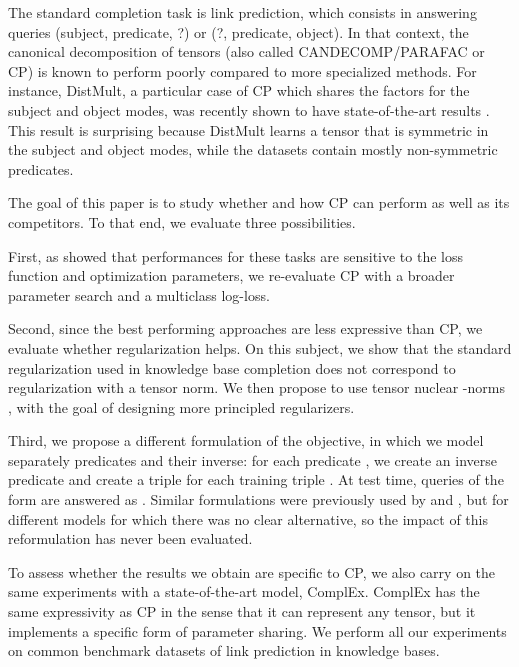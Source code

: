 \documentclass{article}
\newcommand{\CP}{{CP}\xspace}
\newcommand{\complex}{{ComplEx}\xspace}
\newcommand{\distmult}{{DistMult}\xspace}
\begin{document}
The standard completion task is link prediction, which consists in answering queries (subject, predicate, ?) or (?, predicate, object). In that context, the canonical decomposition of tensors (also called CANDECOMP/PARAFAC or \CP) \citep{hitchcock_expression_1927} is known to perform poorly compared to more specialized methods. For instance, \distmult \citep{yang_embedding_2014}, a particular case of \CP which shares the factors for the subject and object modes, was recently shown to have state-of-the-art results \citep{kadlec_knowledge_2017}. This result is surprising because \distmult learns a tensor that is symmetric in the subject and object modes, while the datasets contain mostly non-symmetric predicates.

The goal of this paper is to study whether and how \CP can perform as well as its competitors. To that end, we evaluate three possibilities. 

First, as \citet{kadlec_knowledge_2017} showed that performances for these tasks are sensitive to the loss function and optimization parameters, we re-evaluate \CP with a broader parameter search and a multiclass log-loss. 

Second, since the best performing approaches are less expressive than \CP, we evaluate whether regularization helps. On this subject, we show that the standard regularization used in knowledge base completion does not correspond to regularization with a tensor norm. We then propose to use tensor nuclear -norms \citep{friedland_nuclear_2014}, with the goal of designing more principled regularizers. 

Third, we propose a different formulation of the objective, in which we model separately predicates and their inverse: for each predicate , we create an inverse predicate  and create a triple  for each training triple . At test time, queries of the form  are answered as . Similar formulations were previously used by \citet{shen2016implicit} and \citet{joulin2017fast}, but for different models for which there was no clear alternative, so the impact of this reformulation has never been evaluated.

To assess whether the results we obtain are specific to \CP, we also carry on the same experiments with a state-of-the-art model, \complex \citep{trouillon_complex_2016}. \complex has the same expressivity as \CP in the sense that it can represent any tensor, but it implements a specific form of parameter sharing. We perform all our experiments on  common benchmark datasets of link prediction in knowledge bases. 
\end{document}
